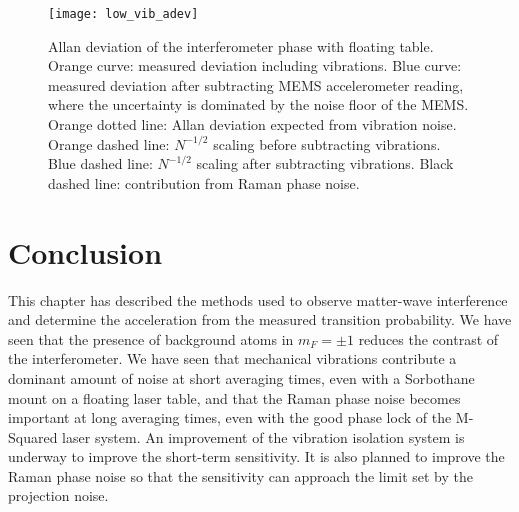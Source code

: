 \nocite{Meunier2015, Fang2016, Dick1990}
\par\noindent
\begin{figure}[htpb!]
  \centering
    \texttt{[image: low\_vib\_adev]}
  \caption[Comparison of Allan deviation in a high and
    low vibration
  environment.]{Allan deviation of the interferometer phase with
    floating table. Orange curve: measured deviation including
    vibrations. Blue curve: measured deviation after subtracting MEMS
    accelerometer reading, where the uncertainty is dominated by the
    noise floor of the MEMS. Orange dotted line: Allan deviation
    expected from vibration noise. Orange dashed line: $N^{-1/2}$
    scaling before subtracting vibrations. Blue dashed line: $N^{-1/2}$
    scaling after subtracting vibrations. Black dashed line:
    contribution from Raman phase noise. }
  \label{fig:low_vib_adev}
\end{figure}

\section{Conclusion}
This chapter has described the methods used to observe matter-wave
interference and determine the acceleration from the measured transition
probability. We have seen that the presence of background atoms in $m_F = \pm 1$
reduces the contrast of the interferometer. We have seen that
mechanical vibrations contribute a dominant amount of noise at short
averaging times, even with
a Sorbothane mount on a floating laser table, and that the Raman phase
noise becomes important at long averaging times, even with the good
phase lock of the M-Squared laser system. An improvement of the vibration
isolation system is underway to improve the
short-term sensitivity. It is also planned to improve the Raman phase noise so that the sensitivity can approach the limit set by the
projection noise.
